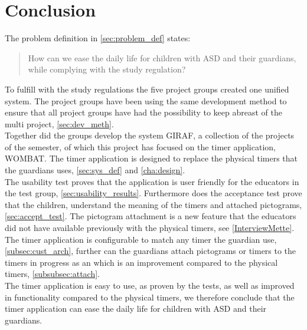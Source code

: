 \chapter{Conclusion}
The problem definition in \autoref{sec:problem_def} states:

\begin{quotation}
How can we ease the daily life for children with ASD and their guardians, while complying with the study regulation? 
\end{quotation}

To fulfill with the study regulations the five project groups created one unified system.
The project groups have been using the same development method to ensure that all project groups have had the possibility to keep abreast of the multi project, \autoref{sec:dev_meth}.\\

Together did the groups develop the system GIRAF, a collection of the projects of the semester, of which this project has focused on the timer application, WOMBAT.
The timer application is designed to replace the physical timers that the guardians uses, \autoref{sec:sys_def} and \autoref{cha:design}.\\

The usability test proves that the application is user friendly for the educators in the test group, \autoref{sec:usability_results}.
Furthermore does the acceptance test prove that the children, understand the meaning of the timers and attached pictograms, \autoref{sec:accept_test}. 
The pictogram attachment is a new feature that the educators did not have available previously with the physical timers, see \autoref{InterviewMette}.\\

The timer application is configurable to match any timer the guardian use, \autoref{subsec:cust_arch}, further can the guardians attach pictograms or timers to the timers in progress as an which is an improvement compared to the physical timers, \autoref{subsubsec:attach}.\\ 

The timer application is easy to use, as proven by the tests, as well as improved in functionality compared to the physical timers, we therefore conclude that the timer application can ease the daily life for children with ASD and their guardians.\\


